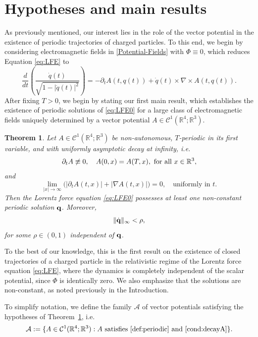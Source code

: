 \documentclass{article}
\newcommand{\boC}{\mathcal{C}}
\newcommand{\R}{\mathbb{R}}
\newcommand{\boA}{\mathcal{A}}
\newcommand{\dq}{\dot{q}}
\newtheorem{theorem}{Theorem}[section]
\theoremstyle{definition}
\begin{document}
\section{Hypotheses and main results}\label{Section:Statements}
As previously mentioned, our interest lies in the role of the vector potential in the existence of periodic trajectories of charged particles. To this end, we begin by considering electromagnetic fields in \eqref{Potential-Fields} with $\Phi \equiv 0$, which reduces Equation \eqref{eq:LFE} to
\begin{equation}\label{eq:LFE0}
	\dfrac{d}{dt}\left(\frac{\dq(t)}{\sqrt{1-|\dq(t)|^2}}\right)=-\partial_t A(t,q(t)) + \dq(t)\times \nabla\times A(t,q(t)).
\end{equation}
After fixing $T>0$, we begin by stating our first main result, which establishes the existence of periodic solutions of \eqref{eq:LFE0} for a large class of electromagnetic fields uniquely determined by a vector potential $A\in\boC^1(\R^4;\R^3)$.
\begin{theorem}\label{MainTheorem1}
	Let $A\in\boC^1\left(\R^4;\R^3\right)$ be non-autonomous, $T$-periodic in its first variable, and with uniformly asymptotic decay at infinity, i.e.
	\begin{equation}\label{def:periodic}
		\partial_tA\not\equiv0,\quad A(0,x)=A(T,x),\ \hbox{for all }x\in\R^3,
	\end{equation}
	and
	\begin{equation}\label{cond:decayA}
		\lim_{|x|\to\infty} \big(\left|\partial_t A(t,x)\right| + |\nabla A(t,x)|\big)=0,\quad\text{uniformly in }t.
	\end{equation}
	Then the Lorentz force equation \eqref{eq:LFE0} possesses at least one non-constant periodic solution ${\bf q}$. Moreover,
	\begin{equation}
		\|\dot{{\bf q}}\|_\infty<\rho,
	\end{equation}
	for some $\rho\in(0,1)$ independent of ${\bf q}$.
\end{theorem}
To the best of our knowledge, this is the first result on the existence of closed trajectories of a charged particle in the relativistic regime of the Lorentz force equation \eqref{eq:LFE}, where the dynamics is completely independent of the scalar potential, since $\Phi$ is identically zero. We also emphasize that the solutions are non-constant, as noted previously in the Introduction. 

To simplify notation, we define the family $\boA$ of vector potentials satisfying the hypotheses of Theorem~\ref{MainTheorem1}, i.e.
\begin{equation}
    \boA:=\{A\in\boC^1(\R^4;\R^3): A \hbox{ satisfies \eqref{def:periodic} and \eqref{cond:decayA}}\}.
\end{equation}
\end{document}
